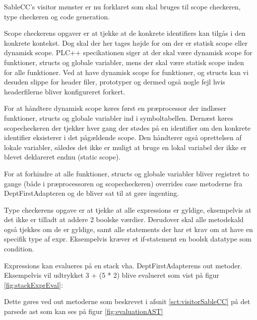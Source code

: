 
SableCC's visitor mønster er nu forklaret som skal bruges til scope checkeren, type checkeren og code generation.

Scope checkerens opgaver er at tjekke at de konkrete identifiers kan tilgås i den konkrete kontekst. Dog skal der her tages højde for om der er statisk scope eller dynamisk scope. PLC++ specikationen siger at der skal være dynamisk scope for funktioner, structs og globale variabler, mens der skal være statisk scope inden for alle funktioner. Ved at have dynamisk scope for funktioner, og structs kan vi desuden slippe for header filer, prototyper og dermed også nogle fejl hvis headerfilerne bliver konfigureret forkert.

For at håndtere dynamisk scope køres først en præprocessor der indlæser funktioner, structs og globale variabler ind i symboltabellen. Dernæst køres scopecheckeren der tjekker hver gang der stødes på en identifier om den konkrete identifier eksisterer i det pågældende scope. Den håndterer også oprettelsen af lokale variabler, således det ikke er muligt at bruge en lokal variabel der ikke er blevet deklareret endnu (static scope).

For at forhindre at alle funktioner, structs og globale variabler bliver registret to gange (både i præprocessoren og scopecheckeren) overrides case metoderne fra DeptFirstAdapteren og de bliver sat til at gøre ingenting.

Type checkerens opgave er at tjekke at alle expressions er gyldige, eksempelvis at det ikke er tilladt at addere 2 boolske værdier. Derudover skal alle metodekald også tjekkes om de er gyldige, samt alle statements der har et krav om at have en specifik type af expr. Eksempelvis kræver et if-statement en boolsk datatype som condition.

Expressions kan evalueres på en stack vha. DeptFirstAdapterens out metoder. Eksempelvis vil udtrykket 3 + (5 * 2) blive evalueret som vist på figur \ref{fig:stackExprEval}:


Dette gøres ved out metoderne som beskrevet i afsnit \ref{sct:visitorSableCC} på det parsede \gls{ast} som kan ses på figur \ref{fig:evaluationAST}

